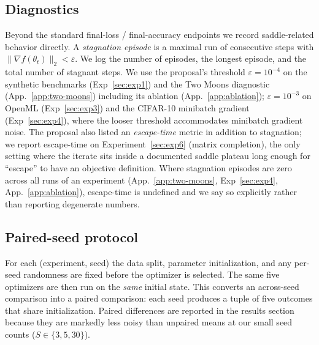 \documentclass[11pt]{article}
\begin{document}
\subsection{Diagnostics}
\label{sec:diagnostics}
Beyond the standard final-loss / final-accuracy endpoints we record
saddle-related behavior directly. A
\emph{stagnation episode} is a maximal run of consecutive steps with
$\|\nabla f(\theta_t)\|_2 < \varepsilon$. We log the number of
episodes, the longest episode, and the total number of stagnant steps.
We use the proposal's threshold $\varepsilon = 10^{-4}$ on the
synthetic benchmarks (Exp~\ref{sec:exp1}) and the Two Moons
diagnostic (App.~\ref{app:two-moons}) including its ablation
(App.~\ref{app:ablation}); $\varepsilon = 10^{-3}$ on OpenML
(Exp~\ref{sec:exp3}) and the CIFAR-10 mini\-batch gradient
(Exp~\ref{sec:exp4}), where the looser threshold accommodates
mini\-batch gradient noise. The proposal also listed an
\emph{escape-time} metric in addition to stagnation; we report
escape-time on Experiment~\ref{sec:exp6} (matrix completion), the
only setting where the iterate sits inside a documented saddle
plateau long enough for ``escape'' to have an objective definition.
Where stagnation episodes are zero across all runs of an experiment
(App.~\ref{app:two-moons}, Exp~\ref{sec:exp4},
App.~\ref{app:ablation}), escape-time is undefined and we say so
explicitly rather than reporting degenerate numbers.

\subsection{Paired-seed protocol}
\label{sec:paired}
For each (experiment, seed) the data split, parameter initialization,
and any per-seed randomness are fixed before the optimizer is
selected. The same five optimizers are then run on the
\emph{same} initial state. This converts an across-seed comparison
into a paired comparison: each seed produces a tuple of five outcomes
that share initialization. Paired differences are reported in the
results section because they are markedly less noisy than unpaired
means at our small seed counts ($S \in \{3, 5, 30\}$).
\end{document}
